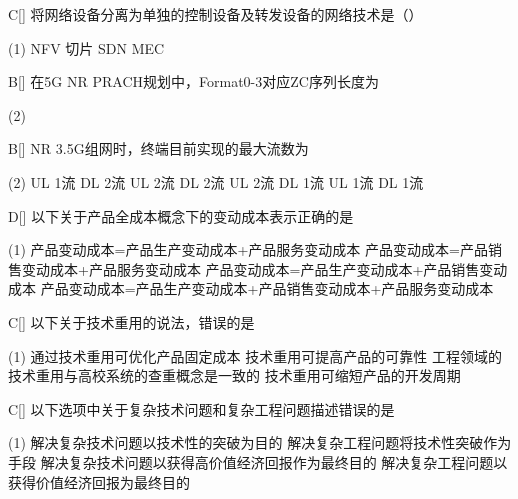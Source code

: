 \begin{choice}{C}[]
	将网络设备分离为单独的控制设备及转发设备的网络技术是（）
	\begin{tasks}(1)
		\task NFV
		\task 切片
		\task SDN
		\task MEC
	\end{tasks}
\end{choice}


\begin{choice}{B}[]
	在5G NR PRACH规划中，Format0-3对应ZC序列长度为
	\begin{tasks}(2)
	\end{tasks}
\end{choice}



\begin{choice}{B}[]
	NR 3.5G组网时，终端目前实现的最大流数为
	\begin{tasks}(2)
		\task UL 1流 DL 2流
		\task UL 2流 DL 2流
		\task UL 2流 DL 1流
		\task UL 1流 DL 1流
	\end{tasks}
\end{choice}


\begin{choice}{D}[]
	以下关于产品全成本概念下的变动成本表示正确的是
	\begin{tasks}(1)
		\task 产品变动成本=产品生产变动成本+产品服务变动成本
		\task 产品变动成本=产品销售变动成本+产品服务变动成本
		\task 产品变动成本=产品生产变动成本+产品销售变动成本
		\task 产品变动成本=产品生产变动成本+产品销售变动成本+产品服务变动成本
	\end{tasks}
\end{choice}


\begin{choice}{C}[]
	以下关于技术重用的说法，错误的是
	\begin{tasks}(1)
		\task 通过技术重用可优化产品固定成本
		\task  技术重用可提高产品的可靠性
		\task 工程领域的技术重用与高校系统的查重概念是一致的
		\task 技术重用可缩短产品的开发周期
	\end{tasks}
\end{choice}


\begin{choice}{C}[]
	以下选项中关于复杂技术问题和复杂工程问题描述错误的是
	\begin{tasks}(1)
		\task 解决复杂技术问题以技术性的突破为目的
		\task 解决复杂工程问题将技术性突破作为手段
		\task 解决复杂技术问题以获得高价值经济回报作为最终目的
		\task 解决复杂工程问题以获得价值经济回报为最终目的
	\end{tasks}
\end{choice}

